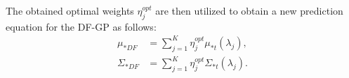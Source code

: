 




The obtained optimal weights $\eta^{opt}_j$ are then utilized to obtain a new prediction equation for the \ac{DF-GP} as follows: 
\begin{align} 
	\mu_{*DF} &= \displaystyle\sum_{j=1}^{K} \eta^{opt}_j \mu_{*t}(\lambda_j) , \label{eq:pred_dfgp1}\\
	\Sigma_{*DF} &=  \displaystyle\sum_{j=1}^{K} \eta^{opt}_j \Sigma_{*t}(\lambda_j). \label{eq:pred_dfgp2}
\end{align}









